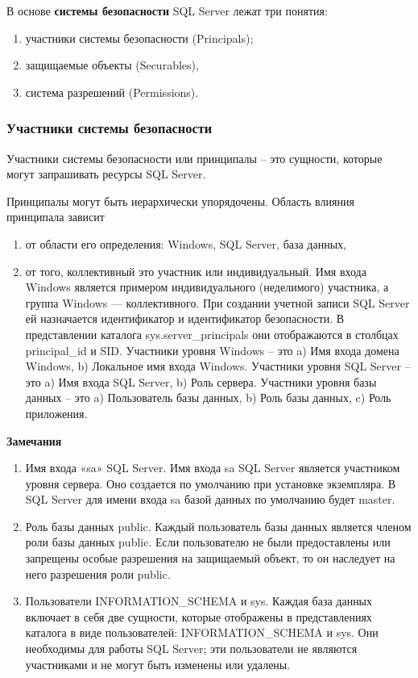В основе \textbf{системы безопасности} SQL Server лежат три понятия:

\begin{enumerate}
	\item участники системы безопасности (Principals);
	\item защищаемые объекты (Securables),
	\item система разрешений (Permissions).
\end{enumerate}

\subsubsection{Участники системы безопасности}

Участники системы безопасности или принципалы – это сущности, которые
могут запрашивать ресурсы SQL Server.

Принципалы могут быть иерархически упорядочены. Область влияния
принципала зависит

\begin{enumerate}
	\item от области его определения: Windows, SQL Server, база данных,
	\item от того, коллективный это участник или индивидуальный. Имя входа
	Windows является примером индивидуального (неделимого) участника,
	а группа Windows — коллективного. При создании учетной записи SQL
	Server ей назначается идентификатор и идентификатор безопасности. В
	представлении каталога sys.server\_principals они отображаются в
	столбцах principal\_id и SID. Участники уровня Windows – это a) Имя
	входа домена Windows, b) Локальное имя входа Windows. Участники
	уровня SQL Server – это a) Имя входа SQL Server, b) Роль сервера.
	Участники уровня базы данных – это a) Пользователь базы данных, b)
	Роль базы данных, c) Роль приложения.
\end{enumerate}

\textbf{Замечания}

\begin{enumerate}
	\item Имя входа «sa» SQL Server. Имя входа sa SQL Server является
	участником уровня сервера. Оно создается по умолчанию при установке
	экземпляра. В SQL Server для имени входа sa базой данных по умолчанию
	будет master.
	\item Роль базы данных public. Каждый пользователь базы данных является
	членом роли базы данных public. Если пользователю не были
	предоставлены или запрещены особые разрешения на защищаемый
	объект, то он наследует на него разрешения роли public.
	\item Пользователи INFORMATION\_SCHEMA и sys. Каждая база данных
	включает в себя две сущности, которые отображены в представлениях
	каталога в виде пользователей: INFORMATION\_SCHEMA и sys. Они
	необходимы для работы SQL Server; эти пользователи не являются
	участниками и не могут быть изменены или удалены.
\end{enumerate}

